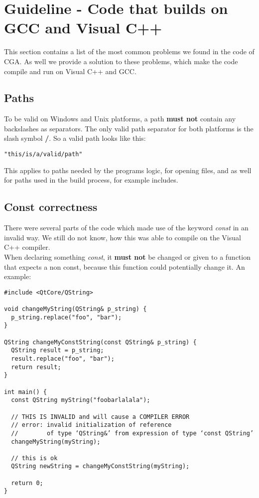 \section{Guideline - Code that builds on GCC and Visual C++} This section contains a list of the most common problems we found in the code of CGA. As well we provide a solution to these problems, which make the code compile and run on Visual C++ and GCC.

\subsection{Paths} To be valid on Windows and Unix platforms, a path \textbf{must not} contain any backslashes as separators. The only valid path separator for both platforms is the slash symbol \textbf{/}. So a valid path looks like this: 
\begin{verbatim}
"this/is/a/valid/path" 
\end{verbatim}
This applies to paths needed by the programs logic, for opening files, and as well for paths used in the build process, for example includes.

\subsection{Const correctness} There were several parts of the code which made use of the keyword \emph{const} in an invalid way. We still do not know, how this was able to compile on the Visual C++ compiler.\\

When declaring something \emph{const}, it \textbf{must not} be changed or given to a function that expects a non const, because this function could potentially change it. An example:
\begin{verbatim}
#include <QtCore/QString>

void changeMyString(QString& p_string) {
  p_string.replace("foo", "bar");
}

QString changeMyConstString(const QString& p_string) {
  QString result = p_string;
  result.replace("foo", "bar");
  return result;
}

int main() {
  const QString myString("foobarlalala");

  // THIS IS INVALID and will cause a COMPILER ERROR
  // error: invalid initialization of reference 
  //        of type ‘QString&’ from expression of type ‘const QString’
  changeMyString(myString);

  // this is ok
  QString newString = changeMyConstString(myString);

  return 0;
}
\end{verbatim}

